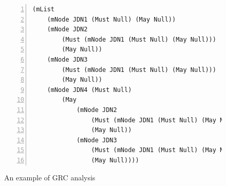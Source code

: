 \begin{figure}[t!]
	\newsavebox{\codeone}
	\begin{lrbox}{\codeone}
		\begin{minipage}[b]{0.62\textwidth}
		\begin{lstlisting}[tabsize=1,basicstyle=\small\ttfamily,numbers=left]
(mList 
	(mNode JDN1 (Must Null) (May Null))
	(mNode JDN2 
		(Must (mNode JDN1 (Must Null) (May Null))) 
		(May Null))
	(mNode JDN3 
		(Must (mNode JDN1 (Must Null) (May Null))) 
		(May Null))
	(mNode JDN4 (Must Null)
		(May 
			(mNode JDN2 
				(Must (mNode JDN1 (Must Null) (May Null))) 
				(May Null))
			(mNode JDN3 
				(Must (mNode JDN1 (Must Null) (May Null))) 
				(May Null))))
		\end{lstlisting}
	\end{minipage}
	\end{lrbox}

	\centering
	\hspace{1.0cm}
	\caption{An example of GRC analysis}
	\label{fig:maymust}
\end{figure}

